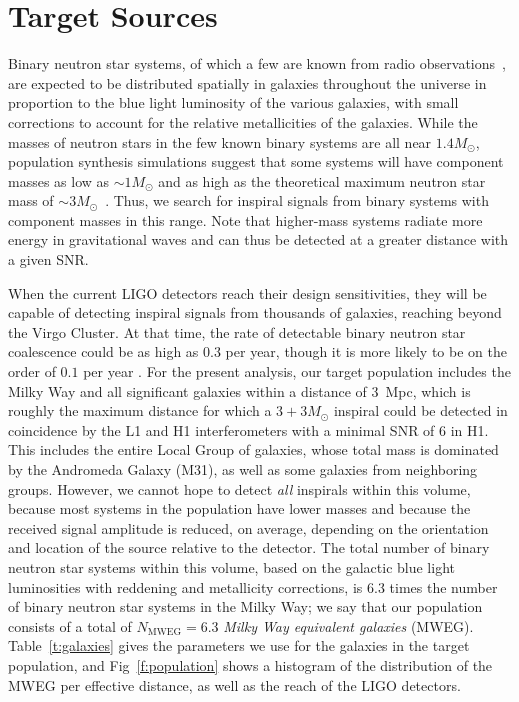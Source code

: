 
\section{Target Sources}

Binary neutron star systems, of which a few are known from radio
observations~\cite{Stairs:2004}, are
expected to be distributed spatially in galaxies throughout the universe in
proportion to the blue light luminosity of the various galaxies, with small
corrections to account for the relative metallicities of the galaxies.
While the masses of neutron stars in the few known binary systems are all
near $1.4 M_\odot$, population synthesis simulations suggest that some
systems will have component masses as low as $\sim 1 M_\odot$ and as
high as the theoretical maximum neutron star mass of $\sim 3
M_\odot$~\cite{Belczynski:2002}.  Thus, we search for inspiral signals
from binary systems with component masses in this range.  Note that
higher-mass systems radiate more energy in gravitational waves and can
thus be detected at a greater distance with a given SNR.

When the current LIGO detectors reach their design sensitivities, they
will be capable of detecting inspiral signals from thousands of
galaxies, reaching beyond the Virgo Cluster.  At that time, the
rate of detectable binary neutron star coalescence could be as high
as $0.3$ per year, though it is more likely to be on the order of
$0.1$ per year \cite{Kalogera:2004tn}.
%
For the present analysis, our target population includes the Milky Way
and all significant galaxies within a distance of 3~Mpc,
which is roughly the maximum distance for which a $3 + 3 M_\odot$
inspiral could be detected in coincidence by the L1 and H1
interferometers with a minimal SNR of 6 in H1.  This includes the
entire Local Group of galaxies, whose total mass is dominated by the
Andromeda Galaxy (M31), as well as some galaxies from neighboring
groups.  However, we cannot hope to detect {\em all} inspirals within
this volume, because most systems in the population have lower masses
and because the received signal amplitude is reduced, on average,
depending on the orientation and location of the source relative to
the detector.
%
The total number of binary neutron star
systems within this volume, based on the galactic blue light luminosities
with reddening and metallicity corrections,
is 6.3 times the number of binary neutron star
systems in the Milky Way; we say that our population consists of a total of
$N_{\text{MWEG}}=6.3$ \emph{Milky Way equivalent galaxies} (MWEG).
Table~\ref{t:galaxies} gives the parameters we use for the galaxies in
the target population, and Fig~\ref{f:population} shows a histogram 
of the distribution of the MWEG per effective distance, as well as the reach of 
the LIGO detectors. 

